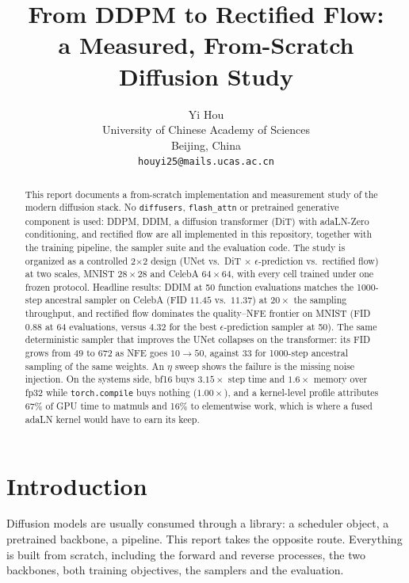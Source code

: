 \documentclass{article}
\title{From DDPM to Rectified Flow:\\
a Measured, From-Scratch Diffusion Study}
\author{%
  Yi Hou \\
  University of Chinese Academy of Sciences\\
  Beijing, China \\
  \texttt{houyi25@mails.ucas.ac.cn}
}
\begin{document}
\maketitle

\begin{abstract}
This report documents a from-scratch implementation and measurement study of the modern
diffusion stack. No \texttt{diffusers}, \texttt{flash\_attn} or pretrained generative
component is used: DDPM, DDIM, a diffusion transformer (DiT) with adaLN-Zero conditioning,
and rectified flow are all implemented in this repository, together with the training
pipeline, the sampler suite and the evaluation code. The study is organized as a controlled
2$\times$2 design (UNet vs.\ DiT $\times$ $\epsilon$-prediction vs.\ rectified flow) at two
scales, MNIST $28\times28$ and CelebA $64\times64$, with every cell trained under one frozen
protocol. Headline results: DDIM at 50 function evaluations matches the 1000-step ancestral
sampler on CelebA (FID $11.45$ vs.\ $11.37$) at $20\times$ the sampling throughput,
and rectified flow dominates the quality--NFE frontier on MNIST (FID $0.88$ at 64
evaluations, versus $4.32$ for the best $\epsilon$-prediction sampler at 50). The same
deterministic sampler that improves the UNet collapses on the transformer: its FID grows from
$49$ to $672$ as NFE goes $10\rightarrow50$, against $33$ for 1000-step ancestral sampling of
the same weights. An $\eta$ sweep shows the failure is the missing noise injection. On the
systems side, bf16 buys $3.15\times$ step time and $1.6\times$ memory over
fp32 while \texttt{torch.compile} buys nothing ($1.00\times$), and a kernel-level profile
attributes 67\% of GPU time to matmuls and 16\% to elementwise work, which is where a fused
adaLN kernel would have to earn its keep.

\end{abstract}

\section{Introduction}

Diffusion models are usually consumed through a library: a scheduler object, a pretrained
backbone, a pipeline. This report takes the opposite route. Everything is built from scratch,
including the forward and reverse processes, the two backbones, both training objectives, the
samplers and the evaluation.
\end{document}
